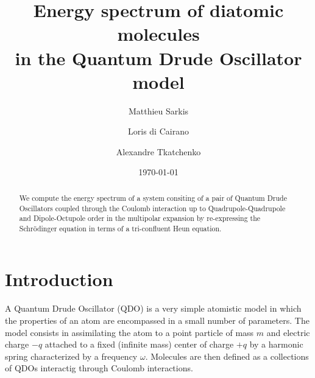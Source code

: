 \documentclass[reprint, amsmath, amssymb, aps, prl]{revtex4-2}
\begin{document}

\title{Energy spectrum of diatomic molecules\\ in the Quantum Drude Oscillator model}

\author{Matthieu Sarkis}

\author{Loris di Cairano}%

\author{Alexandre Tkatchenko}%



\date{\today}

\begin{abstract}

    We compute the energy spectrum of a system consiting of a pair of Quantum Drude Oscillators coupled through the Coulomb interaction up to Quadrupole-Quadrupole and Dipole-Octupole order in the multipolar expansion by re-expressing the Schr\"odinger equation in terms of a tri-confluent Heun equation.

\end{abstract}

\maketitle


\section{Introduction}

    A Quantum Drude Oscillator (QDO) is a very simple atomistic model in which the properties of an atom are encompassed in a small number of parameters. The model consists in assimilating the atom to a point particle of mass $m$ and electric charge $-q$ attached to a fixed (infinite mass) center of charge $+q$ by a harmonic spring characterized by a frequency $\omega$. Molecules are then defined as a collections of QDOs interactig through Coulomb interactions.
\end{document}

